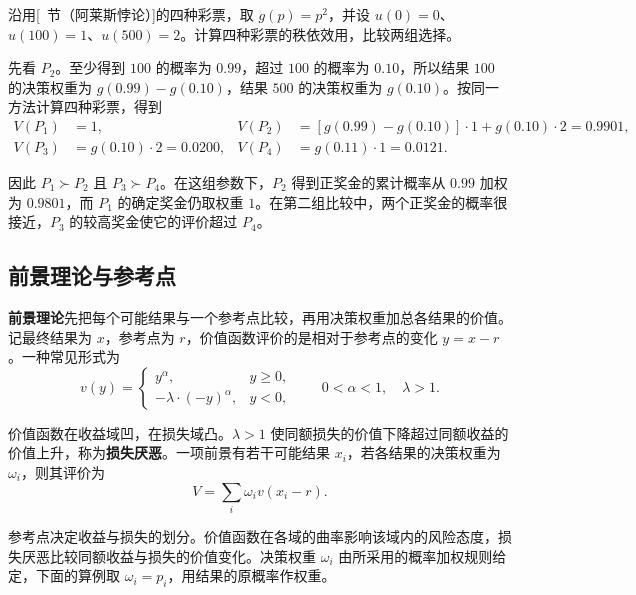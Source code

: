 \begin{tcolorbox}[example,title=课堂例题：用秩依效用比较阿莱斯彩票]
\begin{question}
沿用[~节（阿莱斯悖论）]的四种彩票，取 $g(p)=p^2$，并设 $u(0)=0$、$u(100)=1$、$u(500)=2$。计算四种彩票的秩依效用，比较两组选择。
\end{question}
\begin{solution}[blank-type=manual,blank-vsep=5\baselineskip]
先看 $P_2$。至少得到 $100$ 的概率为 $0.99$，超过 $100$ 的概率为 $0.10$，所以结果 $100$ 的决策权重为 $g(0.99)-g(0.10)$，结果 $500$ 的决策权重为 $g(0.10)$。按同一方法计算四种彩票，得到
\[
\begin{aligned}
 V(P_1)&=1, &
 V(P_2)&=[g(0.99)-g(0.10)]\cdot 1+g(0.10)\cdot 2=0.9901,\\
 V(P_3)&=g(0.10)\cdot 2=0.0200, &
 V(P_4)&=g(0.11)\cdot 1=0.0121.
\end{aligned}
\]

因此 $P_1\succ P_2$ 且 $P_3\succ P_4$。在这组参数下，$P_2$ 得到正奖金的累计概率从 $0.99$ 加权为 $0.9801$，而 $P_1$ 的确定奖金仍取权重 $1$。在第二组比较中，两个正奖金的概率很接近，$P_3$ 的较高奖金使它的评价超过 $P_4$。
\end{solution}
\end{tcolorbox}

\subsection{前景理论与参考点}
\begin{tcolorbox}[knowledge,title=收益、损失与损失厌恶]
\textbf{前景理论}先把每个可能结果与一个参考点比较，再用决策权重加总各结果的价值。记最终结果为 $x$，参考点为 $r$，价值函数评价的是相对于参考点的变化 $y=x-r$。一种常见形式为
\[
 v(y)=\begin{cases}y^\alpha,&y\ge0,\\-\lambda\cdot(-y)^\alpha,&y<0,\end{cases}
 \qquad0<\alpha<1,\quad\lambda>1.
\]

价值函数在收益域凹，在损失域凸。$\lambda>1$ 使同额损失的价值下降超过同额收益的价值上升，称为\textbf{损失厌恶}。一项前景有若干可能结果 $x_i$，若各结果的决策权重为 $\omega_i$，则其评价为
\[
 V=\sum_i\omega_i v(x_i-r).
\]
\end{tcolorbox}

参考点决定收益与损失的划分。价值函数在各域的曲率影响该域内的风险态度，损失厌恶比较同额收益与损失的价值变化。决策权重 $\omega_i$ 由所采用的概率加权规则给定，下面的算例取 $\omega_i=p_i$，用结果的原概率作权重。

